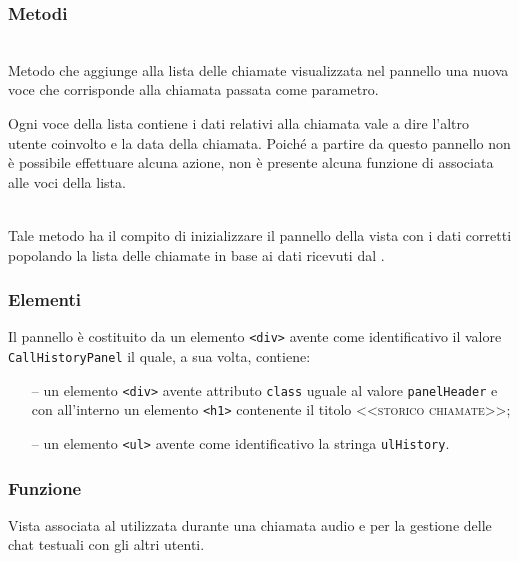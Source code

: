 \subsubsection*{Metodi}
\begin{description}

  \item{}\\
  Metodo che aggiunge alla lista delle chiamate visualizzata nel pannello una nuova voce che corrisponde alla chiamata passata come parametro.
  
  Ogni voce della lista contiene i dati relativi alla chiamata vale a dire l'altro utente coinvolto e la data della chiamata. Poiché a partire da questo pannello non è possibile effettuare alcuna azione, non è presente alcuna funzione di  associata alle voci della lista.
  
  \item{}\\
  Tale metodo ha il compito di inizializzare il pannello della vista con i dati corretti popolando la lista delle chiamate in base ai dati ricevuti dal .
  
\end{description}

\subsubsection*{Elementi}
Il pannello è costituito da un elemento \verb'<div>' avente come identificativo il valore \verb'CallHistoryPanel' il quale, a sua volta, contiene:
\begin{itemize}
  \item[--] un elemento \verb'<div>' avente attributo \verb'class' uguale al valore \verb'panelHeader' e con all'interno un elemento \verb'<h1>' contenente il titolo \textsc{<<storico chiamate>>};
  \item[--] un elemento \verb'<ul>' avente come identificativo la stringa \verb'ulHistory'.
\end{itemize}


\subsubsection*{Funzione}
Vista associata al   utilizzata durante una chiamata audio e per la gestione delle chat testuali con gli altri utenti.

